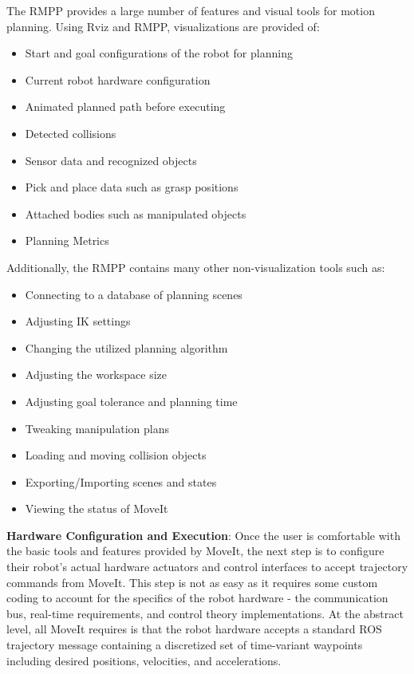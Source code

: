\documentclass[10pt,journal,compsoc]{joser1}
\begin{document}
{The RMPP provides a large number of features and visual tools for motion planning. Using Rviz and RMPP, visualizations are provided of:
\begin{itemize}
    \item Start and goal configurations of the robot for planning
    \item Current robot hardware configuration
    \item Animated planned path before executing
    \item Detected collisions
    \item Sensor data and recognized objects
    \item Pick and place data such as grasp positions
    \item Attached bodies such as manipulated objects
    \item Planning Metrics
\end{itemize}

Additionally, the RMPP contains many other non-visualization tools such as:
\begin{itemize}
    \item Connecting to a database of planning scenes
    \item Adjusting IK settings
    \item Changing the utilized planning algorithm
    \item Adjusting the workspace size
    \item Adjusting goal tolerance and planning time
    \item Tweaking manipulation plans
    \item Loading and moving collision objects
    \item Exporting/Importing scenes and states
    \item Viewing the status of MoveIt
\end{itemize}

{\bf Hardware Configuration and Execution}: Once the user is comfortable with the basic tools and features provided by MoveIt, the next step is to configure their robot's actual hardware actuators and control interfaces to accept trajectory commands from MoveIt. This step is not as easy as it requires some custom coding to account for the specifics of the robot hardware - the communication bus, real-time requirements, and control theory implementations. At the abstract level, all MoveIt requires is that the robot hardware accepts a standard ROS trajectory message containing a discretized set of time-variant waypoints including desired positions, velocities, and accelerations.  

}
\end{document}
